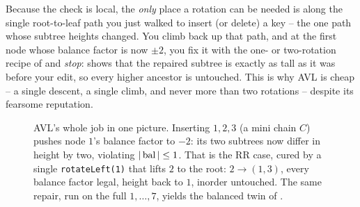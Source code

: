 Because the check is local, the \emph{only} place a rotation can be needed is along the single
root-to-leaf path you just walked to insert (or delete) a key -- the one path whose subtree heights
changed. You climb back up that path, and at the first node whose balance factor is now $\pm 2$, you fix
it with the one- or two-rotation recipe of  and \emph{stop}: 
shows that the repaired subtree is exactly as tall as it was before your edit, so every higher ancestor
is untouched. This is why AVL is cheap -- a single descent, a single climb, and never more than two
rotations -- despite its fearsome reputation.

\begin{figure}[H]
\centering
{}
\caption{AVL's whole job in one picture. Inserting $1,2,3$ (a mini chain $C$) pushes node $1$'s balance
factor to $-2$: its two subtrees now differ in height by two, violating $|\operatorname{bal}|\le 1$. That is the RR
case, cured by a single \texttt{rotateLeft(1)} that lifts $2$ to the root: $2\to(1,3)$, every balance
factor legal, height back to $1$, inorder untouched. The same repair, run on the full $1,\dots,7$, yields
the balanced twin of .}\label{fig:c06-avlfig}
\end{figure}

